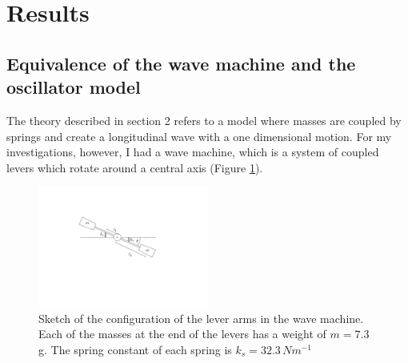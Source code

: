 \documentclass[12pt]{article}
\begin{document}
\section{Results}\label{sec:section5}
\subsection{Equivalence of the wave machine and the oscillator model}\label{sec:results:equivalence}
The theory described in section 2 refers to a model where masses are coupled by springs and create a longitudinal wave with a one dimensional motion. For my investigations, however, I had a wave machine, which is a system of coupled levers which rotate around a central axis (Figure \ref{fig:config}). 
\begin{figure}[hbt]
  \includegraphics[width=0.5\textwidth]{results/equivalance_new.pdf}
  \caption{Sketch of the configuration of the lever arms in the wave machine. Each of the masses at the end of the levers has a weight of $m=7.3$ g. The spring constant of each spring is $k_s=32.3\, Nm^{-1}$}\label{fig:config}
\end{figure}
\end{document}
